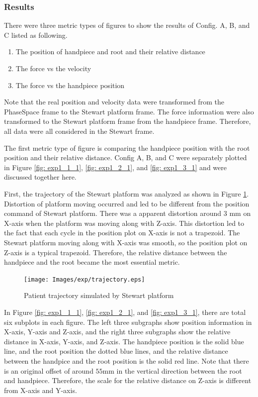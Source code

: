 \subsubsection{Results}
\hspace*{6mm} There were three metric types of figures to show the results of Config. A, B, and C listed as following.
\begin{enumerate}
	\item The position of handpiece and root and their relative distance
	\item The force vs the velocity
	\item The force vs the handpiece position
\end{enumerate}
\par
Note that the real position and velocity data were transformed from the PhaseSpace frame to the Stewart platform frame. The force information were also transformed to the Stewart platform frame from the handpiece frame. Therefore, all data were all considered in the Stewart frame.
\par
The first metric type of figure is comparing the handpiece position with the root position and their relative distance. Config A, B, and C were separately plotted in Figure \ref{fig: exp1_1_1}, \ref{fig: exp1_2_1}, and \ref{fig: exp1_3_1} and were discussed together here.
\par
First, the trajectory of the Stewart platform was analyzed as shown in Figure \ref{fig: distortion}. Distortion of platform moving occurred and led to be different from the position command of Stewart platform. There was a apparent distortion around $3$ mm on X-axis when the platform was moving along with Z-axis. This distortion led to the fact that each cycle in the position plot on X-axis is not a trapezoid. The Stewart platform moving along with X-axis was smooth, so the position plot on Z-axis is a typical trapezoid. Therefore, the relative distance between the handpiece and the root became the most essential metric. 
\begin{figure}[htbp]
\begin{center}
\texttt{[image: Images/exp/trajectory.eps]}
\caption{Patient trajectory simulated by Stewart platform}
\label{fig: distortion}
\end{center}
\end{figure}
\par
In Figure \ref{fig: exp1_1_1}, \ref{fig: exp1_2_1}, and \ref{fig: exp1_3_1}, there are total six subplots in each figure. The left three subgraphs show position information in X-axis, Y-axis and Z-axis, and the right three subgraphs show the relative distance in X-axis, Y-axis, and Z-axis. The handpiece position is the solid blue line, and the root position the dotted blue lines, and the relative distance between the handpice and the root position is the solid red line. Note that there is an original offset of around $55$mm in the vertical direction between the root and handpiece. Therefore, the scale for the relative distance on Z-axis is different from X-axis and Y-axis.
